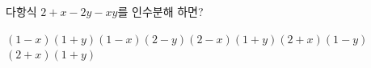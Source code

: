 다항식 $2+x-2y-xy$를 인수분해 하면?
\begin{choices32}{$(1-x)(1+y)$}{$(1-x)(2-y)$}{$(2-x)(1+y)$}{$(2+x)(1-y)$}{$(2+x)(1+y)$}\end{choices32}
